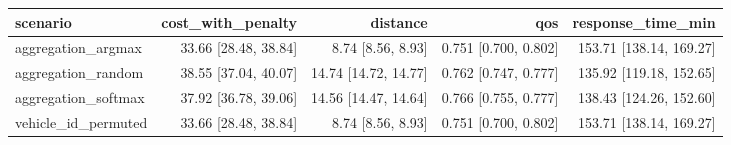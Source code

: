 \begin{tabular}{lrrrr}
\toprule
scenario & cost\_with\_penalty & distance & qos & response\_time\_min \\
\midrule
aggregation\_argmax & 33.66 [28.48, 38.84] & 8.74 [8.56, 8.93] & 0.751 [0.700, 0.802] & 153.71 [138.14, 169.27] \\
aggregation\_random & 38.55 [37.04, 40.07] & 14.74 [14.72, 14.77] & 0.762 [0.747, 0.777] & 135.92 [119.18, 152.65] \\
aggregation\_softmax & 37.92 [36.78, 39.06] & 14.56 [14.47, 14.64] & 0.766 [0.755, 0.777] & 138.43 [124.26, 152.60] \\
vehicle\_id\_permuted & 33.66 [28.48, 38.84] & 8.74 [8.56, 8.93] & 0.751 [0.700, 0.802] & 153.71 [138.14, 169.27] \\
\bottomrule
\end{tabular}
